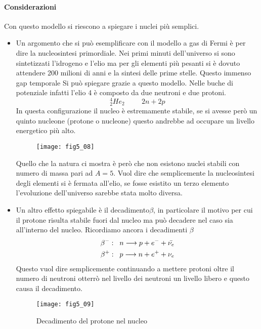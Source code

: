\paragraph{Considerazioni}
Con questo modello si riescono a spiegare i nuclei più semplici.
\begin{itemize}
\item Un argomento che si può esemplificare con il modello a gas di Fermi è per dire la nucleosintesi primordiale.
Nei primi minuti dell'universo si sono sintetizzati l'idrogeno e l'elio ma per gli elementi più pesanti si è dovuto attendere 200 milioni di anni e la sintesi delle prime stelle.
Questo immenso gap temporale Si può spiegare grazie a questo modello.
Nelle buche di potenziale infatti l'elio 4 è composto da due neutroni e due protoni.
\begin{equation}
^4_2He_2\hspace{1cm}2n+2p
\end{equation}
In questa configurazione il nucleo è estremamente stabile, se si avesse però un quinto nucleone (protone o nucleone) questo andrebbe ad occupare un livello energetico più alto.
\begin{figure}[h]
\centering
\texttt{[image: fig5\_08]}
\end{figure}

Quello che la natura ci mostra è però che non esistono nuclei stabili con numero di massa pari ad $A=5$.
Vuol dire che semplicemente la nucleosintesi degli elementi si è fermata all'elio, se fosse esistito un terzo elemento l'evoluzione dell'universo sarebbe stata molto diversa.

\item Un altro effetto spiegabile è il decadimento$\beta$, in particolare il motivo per cui il protone risulta stabile fuori dal nucleo ma può decadere nel caso sia all'interno del nucleo.
Ricordiamo ancora i decadimenti $\beta$
\begin{equation}
\begin{split}
\beta^-:\hspace{0.2cm}n\longrightarrow p+e^-+\bar{\nu_e}\\
\beta^+:\hspace{0.2cm}p\longrightarrow n+e^++\nu_e
\end{split}
\end{equation}
Questo vuol dire semplicemente continuando a mettere protoni oltre il numero di neutroni otterrò nel livello dei neutroni un livello libero e questo causa il decadimento.
\begin{figure}[h]
\centering
\texttt{[image: fig5\_09]}
\caption{Decadimento del protone nel nucleo}
\end{figure}


\end{itemize}
